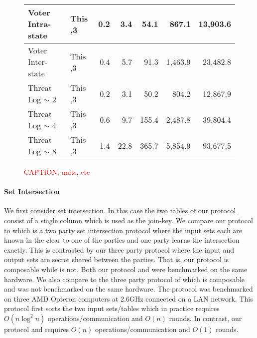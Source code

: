 \begin{figure*}[t!]
\begin{tabular}{|l |l|| r | r |r |r|r|}
		Voter Intra-state                 & This                           \hfill ,3        & 0.2   & 3.4      & 54.1     & 867.1    & 13,903.6 \\ \hline
		Voter Inter-state                 & This                           \hfill ,3        & 0.4   & 5.7      & 91.3     & 1,463.9  & 23,482.8 \\ \hline\hline
		Threat Log $\sim$ 2               & This                           \hfill ,3        & 0.2   & 3.1      & 50.2     & 804.2    & 12,867.9 \\ \hline
		Threat Log $\sim$ 4               & This                           \hfill ,3        & 0.6   & 9.7      & 155.4    & 2,487.8  & 39,804.4 \\ \hline
		Threat Log $\sim$ 8               & This                           \hfill ,3        & 1.4   & 22.8     & 365.7    & 5,854.9  & 93,677.5 \\ \hline
	\end{tabular}
	\caption{\label{fig:comm}	\textcolor{red}{CAPTION, units, etc} }
\end{figure*}




\paragraph{Set Intersection} We first consider set intersection. In this case the two tables of our protocol consist of a single column which is used as the join-key. We compare our protocol to \cite{CCS:KKRT16} which is a two party set intersection protocol where the input sets each are known in the clear to one of the parties and one party learns the intersection exactly. This is contrasted by our three party protocol where the input and output sets are secret shared between the parties. That is, our protocol is composable while \cite{CCS:KKRT16} is not. Both our protocol and \cite{CCS:KKRT16} were benchmarked on the same hardware. We also compare to the three party protocol of \cite{ASIACCS:BlaAgu12} which is composable and was not benchmarked on the same hardware. The \cite{ASIACCS:BlaAgu12} protocol was benchmarked on three AMD Opteron computers at 2.6GHz connected on a LAN network.  This protocol first sorts the two input sets/tables which in practice requires $O(n\log^2 n)$ operations/communication and $O(n)$ rounds\cite{ASIACCS:BlaAgu12}. In contrast, our protocol and \cite{CCS:KKRT16} requires $O(n)$ operations/communication and $O(1)$ rounds. 

